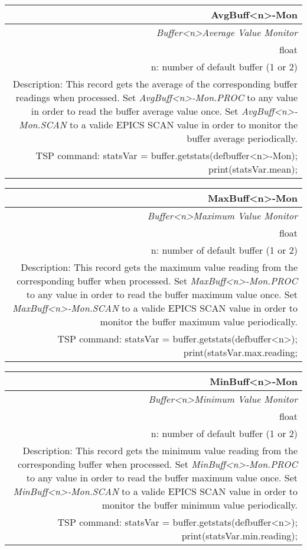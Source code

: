 \documentclass[openany]{article}
\begin{document}
		\begin{tabular}{N}
			\hline
			\bfseries AvgBuff\textless n\textgreater-Mon\label{pv:avgbuff-mon} \\ \hline
			\emph{Buffer\textless n\textgreater Average Value Monitor} \\
			float \\
			n: number of default buffer (1 or 2) \\
			Description: This record gets the average of the corresponding buffer readings when processed. Set \emph{AvgBuff\textless n\textgreater-Mon.PROC} to any value in order to read the buffer average value once. Set \emph{AvgBuff\textless n\textgreater-Mon.SCAN} to a valide EPICS SCAN value in order to monitor the buffer average periodically. \\
			TSP command: statsVar = buffer.getstats(defbuffer\textless n\textgreater-Mon); print(statsVar.mean);
		\end{tabular}

		\begin{tabular}{N}
			\hline
			\bfseries MaxBuff\textless n\textgreater-Mon\label{pv:maxbuff-mon} \\ \hline
			\emph{Buffer\textless n\textgreater Maximum Value Monitor} \\
			float \\
			n: number of default buffer (1 or 2) \\
			Description: This record gets the maximum value reading from the corresponding buffer when processed. Set \emph{MaxBuff\textless n\textgreater-Mon.PROC} to any value in order to read the buffer maximum value once. Set \emph{MaxBuff\textless n\textgreater-Mon.SCAN} to a valide EPICS SCAN value in order to monitor the buffer maximum value periodically. \\
			TSP command: statsVar = buffer.getstats(defbuffer\textless n\textgreater); print(statsVar.max.reading;
		\end{tabular}

		\begin{tabular}{N}
			\hline
			\bfseries MinBuff\textless n\textgreater-Mon\label{pv:minbuff-mon} \\ \hline
			\emph{Buffer\textless n\textgreater Minimum Value Monitor} \\
			float \\
			n: number of default buffer (1 or 2) \\
			Description: This record gets the minimum value reading from the corresponding buffer when processed. Set \emph{MinBuff\textless n\textgreater-Mon.PROC} to any value in order to read the buffer maximum value once. Set \emph{MinBuff\textless n\textgreater-Mon.SCAN} to a valide EPICS SCAN value in order to monitor the buffer minimum value periodically. \\
			TSP command: statsVar = buffer.getstats(defbuffer\textless n\textgreater); print(statsVar.min.reading);
		\end{tabular}
\end{document}
